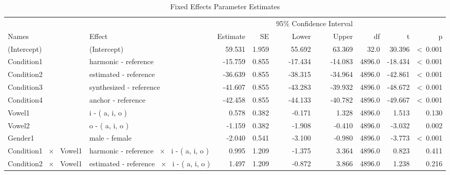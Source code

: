 \documentclass[a4paper,man,hidelinks,floatsintext]{apa7}
\begin{document}
    
\begin{table}[!htbp]
\caption{Fixed Effects Parameter Estimates}
\label{tab:Table_3}
\begin{adjustbox}{max size={\columnwidth}{\textheight}}
\centering
\begin{tabular}{llrrrrrrr}
\hline
\multicolumn{4}{c}{~} & \multicolumn{2}{c}{95\% Confidence Interval} & \multicolumn{3}{c}{~} \\
\cline{5-6}
Names                         & Effect                                             & Estimate &    SE &   Lower &   Upper &     df &       t &               p \\
\hline
(Intercept)                   & (Intercept)                                        &   59.531 & 1.959 &  55.692 &  63.369 &   32.0 &  30.396 & \textless~0.001 \\
Condition1                    & harmonic - reference                               &  -15.759 & 0.855 & -17.434 & -14.083 & 4896.0 & -18.434 & \textless~0.001 \\
Condition2                    & estimated - reference                              &  -36.639 & 0.855 & -38.315 & -34.964 & 4896.0 & -42.861 & \textless~0.001 \\
Condition3                    & synthesized - reference                            &  -41.607 & 0.855 & -43.283 & -39.932 & 4896.0 & -48.672 & \textless~0.001 \\
Condition4                    & anchor - reference                                 &  -42.458 & 0.855 & -44.133 & -40.782 & 4896.0 & -49.667 & \textless~0.001 \\
Vowel1                        & i - ( a, i, o )                                    &    0.578 & 0.382 &  -0.171 &   1.328 & 4896.0 &   1.513 &           0.130 \\
Vowel2                        & o - ( a, i, o )                                    &   -1.159 & 0.382 &  -1.908 &  -0.410 & 4896.0 &  -3.032 &           0.002 \\
Gender1                       & male - female                                      &   -2.040 & 0.541 &  -3.100 &  -0.980 & 4896.0 &  -3.773 & \textless~0.001 \\
Condition1 ~$\times$~ Vowel1  & harmonic - reference ~$\times$~ i - ( a, i, o )    &    0.995 & 1.209 &  -1.375 &   3.364 & 4896.0 &   0.823 &           0.411 \\
Condition2 ~$\times$~ Vowel1  & estimated - reference ~$\times$~ i - ( a, i, o )   &    1.497 & 1.209 &  -0.872 &   3.866 & 4896.0 &   1.238 &           0.216 \\

\end{tabular}
\end{adjustbox}
\end{table}
\end{document}
